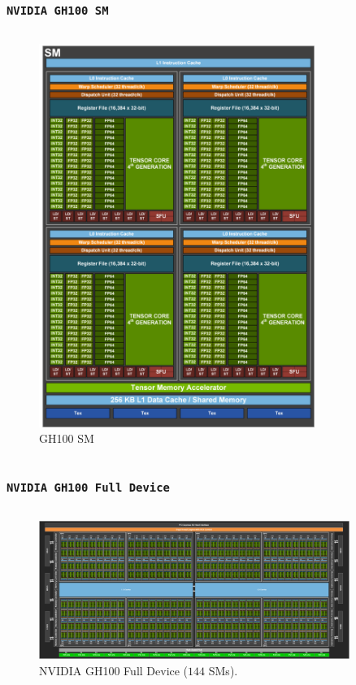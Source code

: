 \begin{frame}
	\frametitle{\texttt{NVIDIA GH100 SM}} 
    \begin{columns}
    \begin{figure}[H]
       \centering
	    \includegraphics[width=0.80\textwidth]{./img/H100-Streaming-Multiprocessor-SM-1104x1536.png}
	    \caption{\small{GH100 SM}}
     \end{figure}
     \end{columns}
\end{frame}

\begin{frame}
        \frametitle{\texttt{NVIDIA GH100 Full Device}}
    \begin{columns}
    \begin{figure}[H]
       \centering
	    \includegraphics[width=0.90\textwidth]{./img/Full-H100-GPU-with-144-SMs-1536x686.png}
	    \caption{\small{NVIDIA GH100 Full Device ($144$ SMs).}}
     \end{figure}
     \end{columns}
\end{frame}

